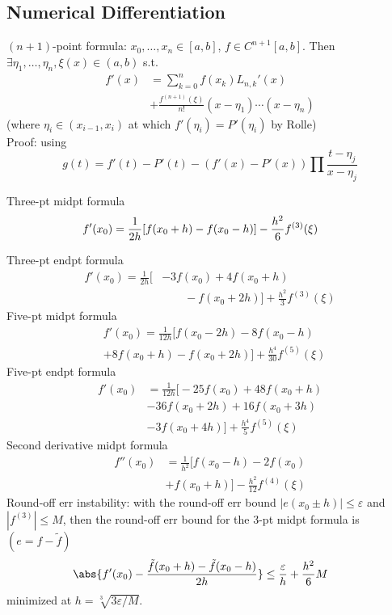 \documentclass[9pt]{memoir}
\begin{document}
\begin{multicols*}{3}
    \setcounter{chapter}{4}
    \setcounter{section}{0}
    \section{Numerical Differentiation}
    \s $(n+1)$-point formula: $x_0,\dots,x_n \in [a,b]$, $f\in C^{n+1}[a,b]$. Then $\exists\eta_1,\dots,\eta_n,\xi(x) \in (a,b)$ s.t.
    \begin{align*}
        f'(x) & = \sum_{k=0}^n f(x_k)L_{n,k}'(x)\\
        &+\frac{f^{(n+1)}(\xi)}{n!}(x-\eta_1)\cdots (x-\eta_n)
    \end{align*}
    (where $\eta_i \in (x_{i-1},x_i)$ at which $f'(\eta_i)=P'(\eta_i)$ by Rolle) \nl
    \\[3.2cm]
    Proof: using
    $$ g(t) = f'(t) - P'(t) - (f'(x) - P'(x))\prod \frac{t-\eta_j}{x-\eta_j} $$

    \s Three-pt midpt formula
    \begin{align*}
        \mkern-30mu f'(x_0) = \frac 1{2h} [f(x_0+h)-f(x_0-h)] - \frac{h^2}6 f^{(3)}(\xi)
    \end{align*}

    \s Three-pt endpt formula
    \begin{align*}
        f'(x_0) = \frac 1{2h} \Big[ & -3f(x_0)+4f(x_0+h)
        \\&\qquad -f(x_0+2h)\Big]+ \frac{h^2}3 f^{(3)} (\xi)
    \end{align*} \vskip3cm
    \s Five-pt midpt formula
    \begin{align*}
       & f'(x_0) = \frac 1{12h}\Big [f(x_0-2h)-8f(x_0-h)
        \\& +8f(x_0+h)-f(x_0+2h)\Big]+ \frac{h^4}{30} f^{(5)}(\xi)
    \end{align*}
    \s Five-pt endpt formula
    \begin{align*}
        f'(x_0) & = \frac 1{12h} \Big[-25f(x_0)+48f(x_0+h)
        \\&-36f(x_0+2h)+16f(x_0+3h)
        \\& -3f(x_0+4h)\Big]+\frac{h^4}{5} f^{(5)}(\xi)
    \end{align*}
    \s Second derivative midpt formula
    \begin{align*}
        f''(x_0) & = \frac 1{h^2}\Big [f(x_0-h)-2f(x_0)
        \\ &+f(x_0+h)\Big]-\frac{h^2}{12}f^{(4)}(\xi)
    \end{align*}
    \s Round-off err instability: with the round-off err bound $|e(x_0\pm h)|\le \varepsilon$ and $|f^{(3)}|\le M$, then the round-off err bound for the 3-pt midpt formula is $(e = f - \tilde f)$
    \begin{align*}
        \mkern-30mu\abs{f'(x_0) - \frac{\tilde f(x_0+h)-\tilde f(x_0-h)}{2h}}\le \frac\varepsilon h + \frac{h^2}6M
    \end{align*}
    minimized at $h=\sqrt[3]{3\varepsilon/M}$.


\end{multicols*}
\end{document}
